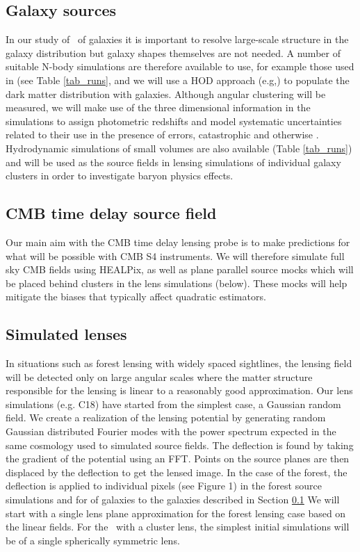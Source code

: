 \subsection{Galaxy sources}
\label{galaxysourcesims}
In our study of \atf\ of galaxies
 it is important to resolve large-scale structure
in the galaxy distribution but galaxy shapes themselves are not needed.
A number of suitable N-body simulations are therefore 
available to use, for example
those used in \cite{zhu2017} (see Table \ref{tab_runs}, and we will use a HOD 
approach (e.g,) to populate the dark matter distribution with galaxies.
Although angular clustering will be measured, we will make use of the 
three dimensional information in the simulations to assign photometric
redshifts and model systematic uncertainties related to their use in 
the presence of errors, catastrophic and otherwise \citep{hearin2010}.
Hydrodynamic simulations of small volumes are also available 
(Table \ref{tab_runs}) and
will be used as the source fields in lensing simulations of individual
galaxy clusters in order to investigate baryon physics effects.

\subsection{CMB time delay source field}
Our main aim with the CMB time delay lensing probe is to make predictions
for what will be possible with CMB S4 instruments. We will therefore
simulate full sky CMB fields using HEALPix, as well as plane parallel
source mocks which will be placed behind clusters in the lens simulations
(below). These mocks will help mitigate the biases that typically affect quadratic estimators.


\subsection{Simulated lenses}
In situations such as forest lensing with widely spaced sightlines, 
the lensing field will be detected only on large angular scales 
where the matter structure responsible for the lensing is linear to a
reasonably good approximation. Our lens simulations (e.g. C18)
have started from the simplest case, a Gaussian random field.   
We create a realization of the lensing potential by generating random 
Gaussian  distributed Fourier modes with the power spectrum expected 
in the same cosmology
 used to simulated source fields.   The deflection is found by taking the 
gradient of the potential using an FFT.  Points on the source planes 
are then displaced by the deflection to get the lensed image. 
In the case of the forest, the deflection is applied to individual pixels
(see Figure 1) in the forest source simulations
 and for \atf of galaxies to the galaxies 
described in Section \ref{galaxysourcesims}
We will start with a single lens plane approximation for the forest lensing
case based on the linear fields. For the \atf\  with a cluster lens, the 
simplest initial simulations will be of a single spherically  symmetric lens.

